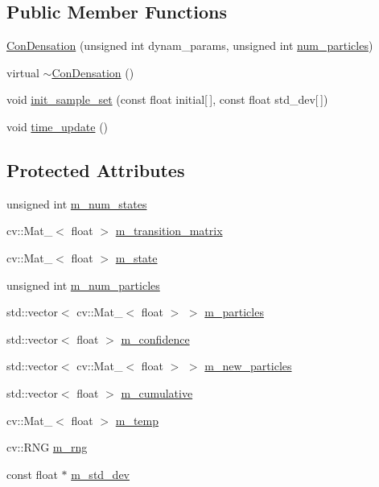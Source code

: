 \subsection*{Public Member Functions}
\begin{DoxyCompactItemize}
\item 
\hyperlink{classConDensation_a3c7e76ac520287c7eb12bf3b05ad5fa0}{Con\-Densation} (unsigned int dynam\-\_\-params, unsigned int \hyperlink{social__robot_8cpp_acf574bc864f7f0fc111320f1d6c449d5}{num\-\_\-particles})
\item 
virtual \hyperlink{classConDensation_aa8176dc480168102bdd41ea10b977878}{$\sim$\-Con\-Densation} ()
\item 
void \hyperlink{classConDensation_aa61120a09e253fe429ee6a912f856fd5}{init\-\_\-sample\-\_\-set} (const float initial\mbox{[}$\,$\mbox{]}, const float std\-\_\-dev\mbox{[}$\,$\mbox{]})
\item 
void \hyperlink{classConDensation_a5aef436b8879d0e97b4503b609678740}{time\-\_\-update} ()
\end{DoxyCompactItemize}
\subsection*{Protected Attributes}
\begin{DoxyCompactItemize}
\item 
unsigned int \hyperlink{classConDensation_a19d27b83f57f5704c920a2ce0276639f}{m\-\_\-num\-\_\-states}
\item 
cv\-::\-Mat\-\_\-$<$ float $>$ \hyperlink{classConDensation_a4aef4dc8a1246b56ca4996cddb4ddebf}{m\-\_\-transition\-\_\-matrix}
\item 
cv\-::\-Mat\-\_\-$<$ float $>$ \hyperlink{classConDensation_ae50f5310d9c2b5574a7fe502b78f2ca1}{m\-\_\-state}
\item 
unsigned int \hyperlink{classConDensation_a6dd623ea8aa0fda252df3676dec562be}{m\-\_\-num\-\_\-particles}
\item 
std\-::vector$<$ cv\-::\-Mat\-\_\-$<$ float $>$ $>$ \hyperlink{classConDensation_a0500c90957d129d1f17512aa0ec4f490}{m\-\_\-particles}
\item 
std\-::vector$<$ float $>$ \hyperlink{classConDensation_abc5be0956acb4bd5c6383c4e095aac86}{m\-\_\-confidence}
\item 
std\-::vector$<$ cv\-::\-Mat\-\_\-$<$ float $>$ $>$ \hyperlink{classConDensation_a489443034896778939e5e24741d42728}{m\-\_\-new\-\_\-particles}
\item 
std\-::vector$<$ float $>$ \hyperlink{classConDensation_a9062fce705b93a2ab93c114aa579943a}{m\-\_\-cumulative}
\item 
cv\-::\-Mat\-\_\-$<$ float $>$ \hyperlink{classConDensation_a3908e7f2187a4b0010fadff24b950130}{m\-\_\-temp}
\item 
cv\-::\-R\-N\-G \hyperlink{classConDensation_a3485c3841850db0017d06781fa7064cf}{m\-\_\-rng}
\item 
const float $\ast$ \hyperlink{classConDensation_ace037712799e93339a0146a5f2891e35}{m\-\_\-std\-\_\-dev}
\end{DoxyCompactItemize}


